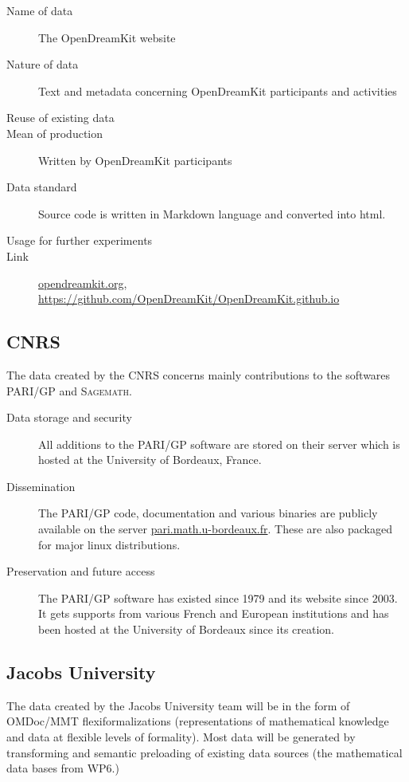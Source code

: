 \documentclass[12pt]{article}
\newcommand{\software}[1]{\textsc{#1}\xspace}
\newcommand{\Sage}{\software{Sagemath}}
\newcommand{\PARIGP}{\software{PARI/GP}}
\begin{document}
\begin{enumerate}
\begin{description}
\item[Name of data] The OpenDreamKit website
\item[Nature of data] Text and metadata concerning OpenDreamKit participants and activities
\item[Reuse of existing data]
\item[Mean of production] Written by OpenDreamKit participants
\item[Data standard] Source code is written in Markdown language and converted into html.
\item [Usage for further experiments]
\item [Link] \href{http://opendreamkit.org/}{opendreamkit.org}, \href{https://github.com/OpenDreamKit/OpenDreamKit.github.io}{https://github.com/OpenDreamKit/OpenDreamKit.github.io}
\end{description}

\end{enumerate}

\subsection{CNRS}

The data created by the CNRS concerns mainly contributions to the softwares \PARIGP and \Sage.
\begin{description}
\item[Data storage and security] All additions to the \PARIGP software are stored on their server which is hosted at the University of Bordeaux, France.
\item[Dissemination] The \PARIGP code, documentation and various binaries are publicly available on the server \href{http://pari.math.u-bordeaux.fr/}{pari.math.u-bordeaux.fr}. These are also packaged for major linux distributions.
\item[Preservation and future access] The \PARIGP software has existed
  since 1979 and its website since 2003. It gets supports from various
  French and European institutions and has been hosted at the University of Bordeaux since its creation.
\end{description}


\subsection{Jacobs University}

The data created by the Jacobs University team will be in the form of OMDoc/MMT
flexiformalizations (representations of mathematical knowledge and data at flexible levels
of formality). Most data will be generated by transforming and semantic preloading of
existing data sources (the mathematical data bases from WP6.)
\end{document}
